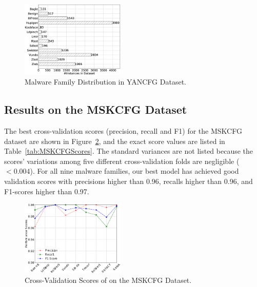 \begin{figure}
\centerline{\includegraphics[width=0.44\textwidth]{Magic/figures/YanAcfgLabelDist.eps}}
\caption{Malware Family Distribution in YANCFG Dataset.}
\label{fig:YANCFGLabelDist}
\end{figure}

\subsection{Results on the MSKCFG Dataset}
The best cross-validation scores (precision, recall and F1) for the MSKCFG dataset are shown in Figure~\ref{fig:MSKCFGScores}, and the exact score values are listed in Table~\ref{tab:MSKCFGScores}.
The standard variances are not listed because the scores' variations among five different cross-validation folds are negligible ($<0.004$).
For all nine malware families, our best model has achieved good validation scores with precisions higher than 0.96, recalls higher than 0.96, and F1-scores higher than 0.97.

\begin{figure}
\centerline{\includegraphics[width=0.44\textwidth]{Magic/figures/MsAcfgScores.eps}}
\caption{Cross-Validation Scores of \sysname on the MSKCFG Dataset.}
\label{fig:MSKCFGScores}
\end{figure}

